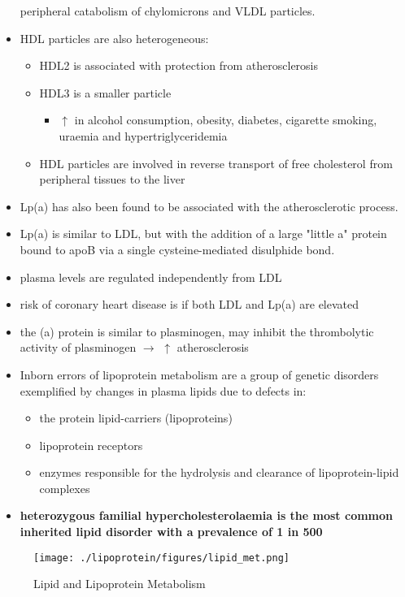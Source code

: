 \documentclass{scrartcl}
\begin{document}
\begin{itemize}
peripheral catabolism of chylomicrons and VLDL particles.
\item HDL particles are also heterogeneous:
\begin{itemize}
\item HDL2 is associated with protection from atherosclerosis
\item HDL3 is a smaller particle
\begin{itemize}
\item \(\uparrow\) in alcohol consumption, obesity, diabetes, cigarette
smoking, uraemia and hypertriglyceridemia
\end{itemize}
\item HDL particles are involved in reverse transport of free
cholesterol from peripheral tissues to the liver
\end{itemize}
\item Lp(a) has also been found to be associated with the atherosclerotic
process.
\item Lp(a) is similar to LDL, but with the addition of a large "little a"
protein bound to apoB via a single cysteine-mediated disulphide
bond.
\item plasma levels are regulated independently from LDL
\item risk of coronary heart disease is \Uparrowcreased if both LDL and
Lp(a) are elevated
\item the (a) protein is similar to plasminogen, may inhibit the
thrombolytic activity of plasminogen \(\to\) \(\uparrow\) atherosclerosis

\item Inborn errors of lipoprotein metabolism are a group of genetic
disorders exemplified by changes in plasma lipids due to defects in:
\begin{itemize}
\item the protein lipid-carriers (lipoproteins)
\item lipoprotein receptors
\item enzymes responsible for the hydrolysis and clearance of
lipoprotein-lipid complexes
\end{itemize}
\item \textbf{heterozygous familial hypercholesterolaemia is the most common}
\textbf{inherited lipid disorder with a prevalence of 1 in 500}
\end{itemize}

\begin{figure}[htbp]
\centering
\texttt{[image: ./lipoprotein/figures/lipid\_met.png]}
\caption{\label{fig:orgd077669}
Lipid and Lipoprotein Metabolism}
\end{figure}
\end{document}
